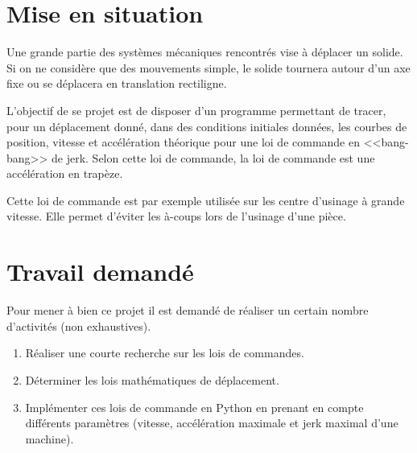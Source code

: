 \documentclass[10pt,fleqn]{article} %
\begin{document}

\vspace{10cm}
\pagestyle{fancy}
\thispagestyle{plain}


\def\columnseprulecolor{\color{ocre}}
\setlength{\columnseprule}{0.4pt} 
\begin{multicols}{2}


\section{Mise en situation}
Une grande partie des systèmes mécaniques rencontrés vise à déplacer un solide. Si on ne considère que des mouvements simple, le solide tournera autour d'un axe fixe ou se déplacera en translation rectiligne.

\begin{obj}
L'objectif de se projet est de disposer d'un programme permettant de tracer, pour un déplacement donné, dans des conditions initiales données, les courbes de position, vitesse et accélération théorique pour une loi de commande en <<bang-bang>> de jerk. Selon cette loi de commande, la loi de commande est une accélération en trapèze.
\end{obj}

Cette loi de commande est par exemple utilisée sur les centre d'usinage à grande vitesse. Elle permet d'éviter les à-coups lors de l'usinage d'une pièce.

\section{Travail demandé}
Pour mener à bien ce projet il est demandé de réaliser un certain nombre d'activités (non exhaustives).
\begin{enumerate}
\item Réaliser une courte recherche sur les lois de commandes. 
\item Déterminer les lois mathématiques de déplacement.
\item Implémenter ces lois de commande en Python en prenant en compte différents paramètres (vitesse, accélération maximale et jerk maximal d'une machine).
\end{enumerate}


\end{multicols}
\end{document}
